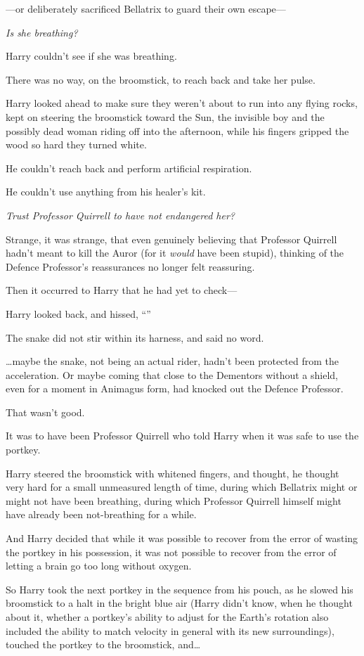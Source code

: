 —or deliberately sacrificed Bellatrix to guard their own escape—

\emph{Is she breathing?}

Harry couldn’t see if she was breathing.

There was no way, on the broomstick, to reach back and take her pulse.

Harry looked ahead to make sure they weren’t about to run into any flying
rocks, kept on steering the broomstick toward the Sun, the invisible boy and
the possibly dead woman riding off into the afternoon, while his fingers
gripped the wood so hard they turned white.

He couldn’t reach back and perform artificial respiration.

He couldn’t use anything from his healer’s kit.

\emph{Trust Professor Quirrell to have not endangered her?}

Strange, it was strange, that even genuinely believing that Professor Quirrell
hadn’t meant to kill the Auror (for it \emph{would} have been stupid), thinking
of the Defence Professor’s reassurances no longer felt reassuring.

Then it occurred to Harry that he had yet to check—

Harry looked back, and hissed, “”

The snake did not stir within its harness, and said no word.

…maybe the snake, not being an actual rider, hadn’t been protected from
the acceleration. Or maybe coming that close to the Dementors without a shield,
even for a moment in Animagus form, had knocked out the Defence Professor.

That wasn’t good.

It was to have been Professor Quirrell who told Harry when it was safe to use
the portkey.

Harry steered the broomstick with whitened fingers, and thought, he thought
very hard for a small unmeasured length of time, during which Bellatrix might
or might not have been breathing, during which Professor Quirrell himself might
have already been not-breathing for a while.

And Harry decided that while it was possible to recover from the error of
wasting the portkey in his possession, it was not possible to recover from the
error of letting a brain go too long without oxygen.

So Harry took the next portkey in the sequence from his pouch, as he slowed his
broomstick to a halt in the bright blue air (Harry didn’t know, when he thought
about it, whether a portkey’s ability to adjust for the Earth’s rotation also
included the ability to match velocity in general with its new surroundings),
touched the portkey to the broomstick, and…

